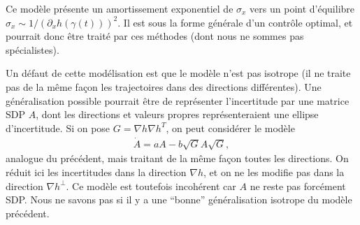 Ce modèle présente un amortissement exponentiel de $\sigma_{x}$ vers
un point d'équilibre
$\sigma_{x} \sim 1/(\partial_{x} h(\gamma(t)))^{2}$. Il est sous la
forme générale d'un contrôle optimal, et pourrait donc être traité par
ces méthodes (dont nous ne sommes pas spécialistes).

Un défaut de cette modélisation est que le modèle n'est pas isotrope
(il ne traite pas de la même façon les trajectoires dans des
directions différentes). Une généralisation possible pourrait être de
représenter l'incertitude par une matrice SDP $A$, dont les directions
et valeurs propres représenteraient une ellipse d'incertitude. Si on
pose $G = \nabla h \nabla h^{T}$, on peut considérer le modèle
\begin{align*}
  \dot A = a A - b \sqrt G A \sqrt G,
\end{align*}
analogue du précédent, mais traitant de la même façon toutes les
directions. On réduit ici les incertitudes dans la direction
$\nabla h$, et on ne les modifie pas dans la direction
$\nabla h^{\perp}$. Ce modèle est toutefois incohérent car $A$ ne
reste pas forcément SDP. Nous ne savons pas si il y a une ``bonne''
généralisation isotrope du modèle précédent.
